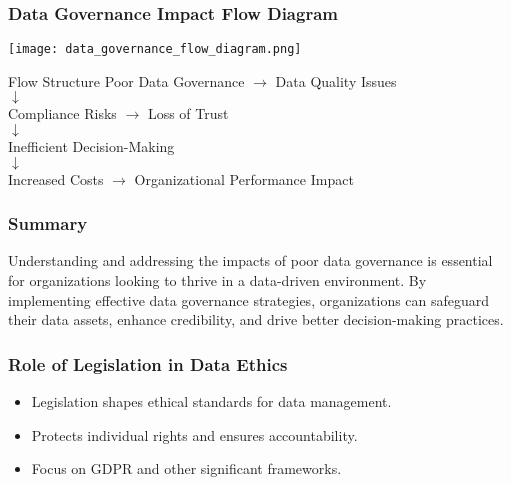 \documentclass[aspectratio=169]{beamer}
\begin{document}
\begin{frame}[fragile]
    \frametitle{Data Governance Impact Flow Diagram}
    \begin{center}
        \texttt{[image: data\_governance\_flow\_diagram.png]} %
    \end{center}
    \begin{block}{Flow Structure}
        Poor Data Governance $\rightarrow$ Data Quality Issues \\
                                        $\downarrow$ \\
                                        Compliance Risks $\rightarrow$ Loss of Trust \\
                                        $\downarrow$ \\
                                        Inefficient Decision-Making \\
                                        $\downarrow$ \\
                                        Increased Costs $\rightarrow$ Organizational Performance Impact
    \end{block}
\end{frame}

\begin{frame}[fragile]
    \frametitle{Summary}
    Understanding and addressing the impacts of poor data governance is essential for organizations looking to thrive in a data-driven environment. By implementing effective data governance strategies, organizations can safeguard their data assets, enhance credibility, and drive better decision-making practices.
\end{frame}

\begin{frame}[fragile]
    \frametitle{Role of Legislation in Data Ethics}
    \begin{itemize}
        \item Legislation shapes ethical standards for data management.
        \item Protects individual rights and ensures accountability.
        \item Focus on GDPR and other significant frameworks.
    \end{itemize}
\end{frame}
\end{document}
